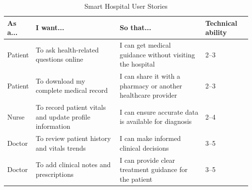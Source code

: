 \vspace{1em}
\begin{table}[H]
\centering
\renewcommand{\arraystretch}{1.4}
\begin{tabular}{|p{2cm}|p{5.2cm}|p{5.2cm}|p{2cm}|}
\hline
\textbf{As a...} & \textbf{I want...} & \textbf{So that...} & \textbf{Technical ability} \\
\hline
Patient & To ask health-related questions online & I can get medical guidance without visiting the hospital & 2--3 \\
\hline
Patient & To download my complete medical record & I can share it with a pharmacy or another healthcare provider & 2--3 \\
\hline
Nurse & To record patient vitals and update profile information & I can ensure accurate data is available for diagnosis & 2--4 \\
\hline
Doctor & To review patient history and vitals trends & I can make informed clinical decisions & 3--5 \\
\hline
Doctor & To add clinical notes and prescriptions & I can provide clear treatment guidance for the patient & 3--5 \\
\hline
\end{tabular}
\caption{Smart Hospital User Stories}
\label{tab:user-stories}
\end{table}
\vspace{1em}
